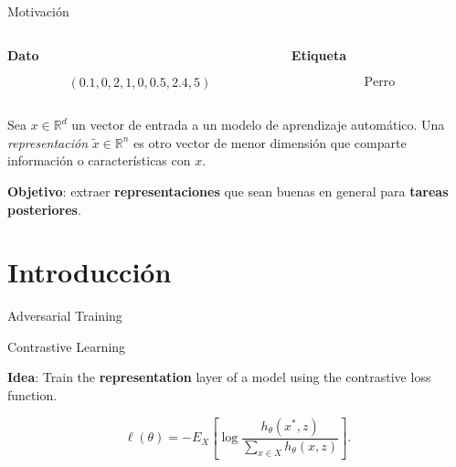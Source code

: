 \documentclass[aspectratio=169]{beamer}
\newcommand{\R}{\mathbb{R}}
\begin{document}
  \begin{frame}{Motivación}

  \centering
  \begin{columns}
      \begin{column}{0.5\textwidth}
        \begin{center}
        \textbf{Dato}
        \end{center}
        \[
      \left(0.1,0,2,1,0,0.5,2.4,5 \right)  
     \]
      \end{column}
      \begin{column}{0.5\textwidth}  %
        \begin{center}
          \textbf{Etiqueta}
          \end{center}
        \[
        \text{Perro}  
        \]

      \end{column}
    \end{columns}


    \pause 
    
    \begin{shaded}
      Sea $x \in \R^d$ un vector de entrada a un modelo de aprendizaje automático. Una \emph{representación} $\tilde{x} \in \R^n$ es otro vector de menor dimensión que comparte información o características con $x$.
    \end{shaded}


    {\color{Maroon}\textbf{Objetivo}:} extraer \textbf{representaciones} que sean buenas en general para \textbf{tareas posteriores}.
  \end{frame}

  
  \section{Introducción}

  \begin{frame}{Adversarial Training}



  \end{frame}

  \begin{frame}{Contrastive Learning}
    \begin{shaded}
      {\color{Maroon}\textbf{Idea}:} Train the \textbf{representation} layer of a model using the contrastive loss function.
    \end{shaded}
     \[
        \ell(\theta) = - E_X \left[ \log \frac{h_\theta(x^*,z)}{\sum_{x \in X}h_\theta(x,z)}\right].
        \]
  \end{frame}
\end{document}
